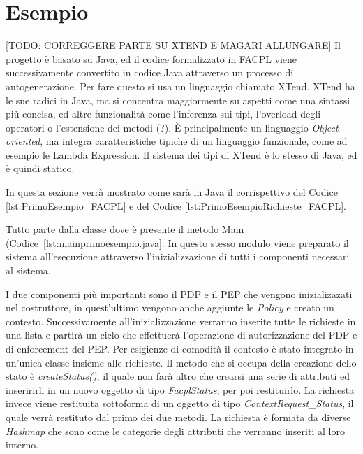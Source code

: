 \section{Esempio} %
\label{sec:esempio}
[TODO: CORREGGERE PARTE SU XTEND E MAGARI ALLUNGARE]
Il progetto è basato su Java, ed il codice formalizzato in FACPL viene successivamente convertito in codice Java attraverso un processo di autogenerazione.
Per fare questo si usa un linguaggio chiamato XTend.
XTend ha le sue radici in Java, ma si concentra maggiormente su aspetti come una sintassi più concisa, ed altre funzionalità come l'inferenza sui tipi, l'overload degli operatori o l'estensione dei metodi (?). 
È principalmente un linguaggio \textit{Object-oriented}, ma integra caratteristiche tipiche di un linguaggio funzionale, come ad esempio le Lambda Expression. Il sistema dei tipi di XTend è lo stesso di Java, ed è quindi statico.\\ \par
In questa sezione verrà mostrato come sarà in Java il corrispettivo del Codice \ref{lst:PrimoEsempio_FACPL} e del Codice \ref{lst:PrimoEsempioRichieste_FACPL}.\\ \par
Tutto parte dalla classe dove è presente il metodo Main (Codice~\ref{lst:mainprimoesempio.java}. In questo stesso modulo viene preparato il sistema all'esecuzione attraverso l'inizializzazione di tutti i componenti necessari al sistema.\\ \par
I due componenti più importanti sono il PDP e il PEP che vengono inizializazati nel costruttore, in quest'ultimo vengono anche aggiunte le \textit{Policy} e creato un contesto. Successivamente all'inizializzazione verranno inserite tutte le richieste in una lista e partirà un ciclo che effettuerà l'operazione di autorizzazione del PDP e di enforcement del PEP.
Per esigienze di comodità il contesto è stato integrato in un'unica classe insieme alle richieste.
Il metodo che si occupa della creazione dello stato è \textit{createStatus()}, il quale non farà altro che crearsi una serie di attributi ed inseririrli in un nuovo oggetto di tipo \textit{FacplStatus}, per poi restituirlo.
La richiesta invece viene restituita sottoforma di un oggetto di tipo \textit{ContextRequest\_Status}, il quale verrà restituto dal primo dei due metodi. La richiesta è formata da diverse \textit{Hashmap} che sono come le categorie degli attributi che verranno inseriti al loro interno.
